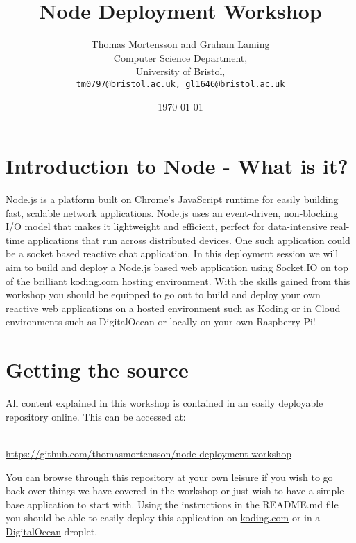 \documentclass[twocolumn]{article}
\begin{document}
\lstset{style=Style1}

\title{Node Deployment Workshop} 
\author{Thomas Mortensson and Graham Laming\\
        	Computer Science Department,\\
		University of Bristol,\\
		\texttt{\href{mailto:tm0797@bristol.ac.uk}{tm0797@bristol.ac.uk}, \href{mailto:gl1646@bristol.ac.uk}{gl1646@bristol.ac.uk}} 
		}
\date{\today} 
\maketitle

\section{Introduction to Node - What is it?}

Node.js is a platform built on Chrome's JavaScript runtime for easily building fast, scalable network applications. Node.js uses an event-driven, non-blocking I/O model that makes it lightweight and efficient, perfect for data-intensive real-time applications that run across distributed devices. One such application could be a socket based reactive chat application. In this deployment session we will aim to build and deploy a Node.js based web application using Socket.IO on top of the brilliant \href{http://koding.com}{koding.com} hosting environment. With the skills gained from this workshop you should be equipped to go out to build and deploy your own reactive web applications on a hosted environment such as Koding or in Cloud environments such as DigitalOcean or locally on your own Raspberry Pi!

\section {Getting the source}

All content explained in this workshop is contained in an easily deployable repository online. This can be accessed at:\\
\\
{\begin{center}
\url{https://github.com/thomasmortensson/node-deployment-workshop}\\
\end{center}
}

You can browse through this repository at your own leisure if you wish to go back over things we have covered in the workshop or just wish to have a simple base application to start with. Using the instructions in the README.md file you should be able to easily deploy this application on \href{http://koding.com}{koding.com} or in a \href{http://digitalocean.com}{DigitalOcean} droplet.
\end{document}
